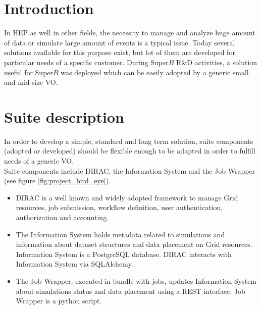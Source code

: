 \documentclass[a4paper]{jpconf}
\begin{document}
\section{Introduction}

In HEP as well in other fields, the necessity to manage and analyze huge amount of data or simulate large amount of events is a typical issue.
Today several solutions available for this purpose exist, but lot of them are developed for particular needs of a specific customer.
During Super$B$ R\&D activities, a solution useful for Super$B$ was deployed which can be easily adopted by a generic small and mid-size VO.

\section{Suite description}

In order to develop a simple, standard and long term solution, suite components (adopted or developed) should be flexible enough to be adapted in order to fulfill needs of a generic VO.\\
Suite components include DIRAC\cite{ref:dirac}, the Information System and the Job Wrapper (see figure \ref{fig:project_bird_eye}).\\
\begin{itemize}
\item DIRAC is a well known and widely adopted framework to manage Grid resources, job submission, workflow definition, user authentication, authorization and accounting.
\item The Information System holds metadata related to simulations and information about dataset structures and data placement on Grid resources. Information System is a PostgreSQL\cite{ref:postgres} database. DIRAC interacts with Information System via SQLAlchemy\cite{ref:sqlalchemy}.
\item The Job Wrapper, executed in bundle with jobs, updates Information System about simulations status and data placement using a REST interface. Job Wrapper is a python script.
\end{itemize}

\end{document}
